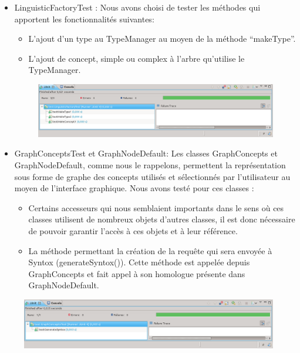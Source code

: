 \documentclass[12pt]{report}
\begin{document}
\begin{itemize}
\begin{figure}[h!]
\begin{center}
\end{center}
\end{figure}
\item LinguisticFactoryTest : Nous avons choisi de tester les méthodes qui apportent les fonctionnalités suivantes: 
	\begin{itemize}
	\item L'ajout d'un type au TypeManager au moyen de la méthode ``makeType''.
	\item L'ajout de concept, simple ou complex à l'arbre qu'utilise le TypeManager.
	\end{itemize}
\begin{figure}[h!]
\begin{center}
	\includegraphics[scale=0.40]{resultatTest4.png}
\end{center}
\end{figure}
\item GraphConceptsTest et GraphNodeDefault: Les classes GraphConcepts et GraphNodeDefault, comme nous le rappelons, permettent la représentation sous forme de graphe des concepts utilisés et sélectionnés par l'utilisateur au moyen de l'interface graphique. 
Nous avons testé pour ces classes :
	\begin{itemize}
	\item Certains accesseurs qui nous semblaient importants dans le sens où ces classes utilisent de nombreux objets d'autres classes, il est donc nécessaire de pouvoir garantir l'accès à ces objets et à leur référence. 
	\item La méthode permettant la création de la requête qui sera envoyée à Syntox (generateSyntox()). Cette méthode est appelée depuis GraphConcepts et fait appel à son homologue présente dans GraphNodeDefault.
	\end{itemize}
\end{itemize}
\begin{figure}[h!]
\begin{center}
	\includegraphics[scale=0.40]{resultatTest2.png}
\end{center}
\end{figure}
\end{document}
